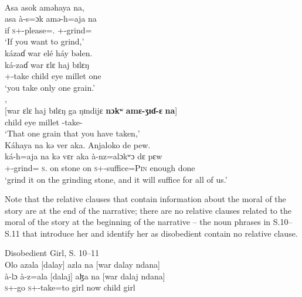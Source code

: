 \ea \label{ex:5:115}\\
Asa  asok  aməhaya  na, \\  
\gll  asa  à-s=ɔk amə-h=aja  na\\
      if     \textsc{s}+{\PFV}-please={\twoS}.{\IO}  {\DEP}+{\PFV}-grind={\PLU}    {\PSP}\\
\glt  ‘If you want to grind,’\\
\medskip
kázaɗ  war  elé  háy  bəlen.\\
\gll  ká-zaɗ war ɛlɛ haj bɪlɛŋ\\
      {\twoS}+{\IFV}-take  child    eye  millet  one\\
\glt  ‘you take only one grain.’\\
,\\
\gll {}[war ɛlɛ haj bɪlɛŋ ga ŋɪndijɛ \textbf{nɔkʷ} \textbf{amɛ-ʒɪɗ-ɛ} \textbf{na}]\\
     child  eye       millet     {\DEM}  {\ADJ}  {\DEM}  {\twoS}   {\DEP}-take{}-{\CL}    {\PSP}\\
\glt ‘That one grain that you have taken,’\\

\largerpage
\medskip
Káhaya  na  kə  ver  aka. Anjaloko  de  pew.\\
\gll ká-h=aja na kə vɛr aka à-nz=alɔkʷɔ dɛ pɛw\\
     {\twoS}+{\IFV}-grind={\PLU}  \textsc{s}.{\DO}  on  stone on            \textsc{s}+{\PFV}-suffice=\textsc{Pin} enough  done\\
\glt ‘grind it on the grinding stone, and it will suffice for all of us.’\\
\z

Note that the relative clauses that contain information about the moral of the story are at the end of the narrative; there are no relative clauses related to the moral of the story at the beginning of the narrative -- the noun phrases in S.10--S.11  that introduce her and identify her as disobedient contain no relative clause. 

\ea \label{ex:5:116}\corpussource Disobedient Girl, S. 10--11\\
Olo  azala  [dalay] azla  na [war  dalay   ndana] \\ 
\gll  à-lɔ           à-z=ala      [dalaj] aɮa  na  [war      dalaj    ndana] \\  
      \textsc{s}+{\PFV}-go   \textsc{s}+{\PFV}-take=to  girl  now   {\PSP}   child    girl    {\DEM}\\  
      

